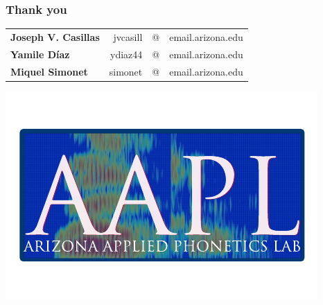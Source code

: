\documentclass{beamer}
\begin{document}
\begin{frame}
\frametitle{Thank you}
\begin{tabular}{l r c l}
\textbf{Joseph V. Casillas} & jvcasill &@ & email.arizona.edu \\ 
\textbf{Yamile D\'{i}az} & ydiaz44 & @ & email.arizona.edu \\
\textbf{Miquel Simonet} & simonet &@ &email.arizona.edu\\
\end{tabular}
\begin{center}
\includegraphics[scale=.75]{aalp_logo.pdf}
\end{center}
\end{frame}
\end{document}
